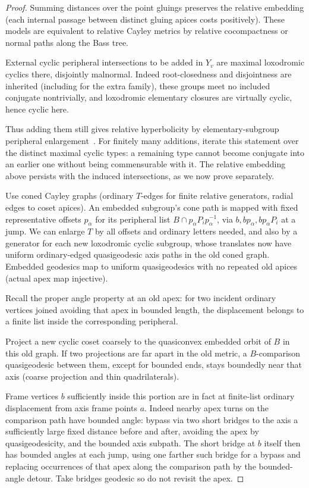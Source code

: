 \begin{proof}
Summing distances over the point gluings preserves the relative embedding (each internal passage between distinct gluing apices costs positively). These models are equivalent to relative Cayley metrics by relative cocompactness or normal paths along the Bass tree.

External cyclic peripheral intersections to be added in \(Y_v\) are maximal loxodromic cyclics there, disjointly malnormal. Indeed root-closedness and disjointness are inherited (including for the extra family), these groups meet no included conjugate nontrivially, and loxodromic elementary closures are virtually cyclic, hence cyclic here.

Thus adding them still gives relative hyperbolicity by elementary-subgroup peripheral enlargement~\cite[Corollary~1.7]{OsinElementary2006}. For finitely many additions, iterate this statement over the distinct maximal cyclic types: a remaining type cannot become conjugate into an earlier one without being commensurable with it. The relative embedding above persists with the induced intersections, as we now prove separately.

Use coned Cayley graphs (ordinary \(T\)-edges for finite relative generators, radial edges to coset apices). An embedded subgroup's cone path is mapped with fixed representative offsets \(p_\alpha\) for its peripheral list \(B\cap p_\alpha P_i p_\alpha^{-1}\), via \(b,bp_\alpha,bp_\alpha P_i\) at a jump. We can enlarge \(T\) by all offsets and ordinary letters needed, and also by a generator for each new loxodromic cyclic subgroup, whose translates now have uniform ordinary-edged quasigeodesic axis paths in the old coned graph. Embedded geodesics map to uniform quasigeodesics with no repeated old apices (actual apex map injective).

Recall the proper angle property at an old apex: for two incident ordinary vertices joined avoiding that apex in bounded length, the displacement belongs to a finite list inside the corresponding peripheral.

Project a new cyclic coset coarsely to the quasiconvex embedded orbit of \(B\) in this old graph. If two projections are far apart in the old metric, a \(B\)-comparison quasigeodesic between them, except for bounded ends, stays boundedly near that axis (coarse projection and thin quadrilaterals).

Frame vertices \(b\) sufficiently inside this portion are in fact at finite-list ordinary displacement from axis frame points \(a\). Indeed nearby apex turns on the comparison path have bounded angle: bypass via two short bridges to the axis a sufficiently large fixed distance before and after, avoiding the apex by quasigeodesicity, and the bounded axis subpath. The short bridge at \(b\) itself then has bounded angles at each jump, using one farther such bridge for a bypass and replacing occurrences of that apex along the comparison path by the bounded-angle detour. Take bridges geodesic so do not revisit the apex.


\end{proof}
